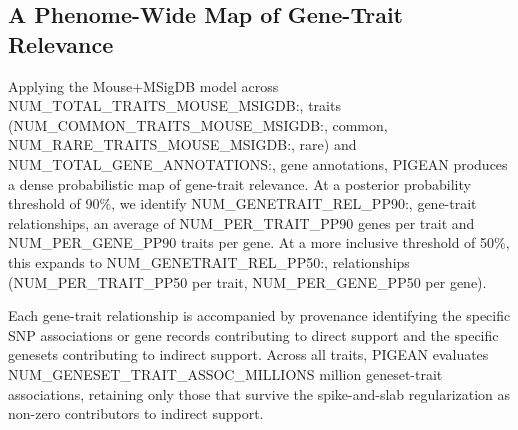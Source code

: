 \subsection{A Phenome-Wide Map of Gene-Trait Relevance}


Applying the Mouse+MSigDB model across {{NUM_TOTAL_TRAITS_MOUSE_MSIGDB:,}} traits ({{NUM_COMMON_TRAITS_MOUSE_MSIGDB:,}} common, {{NUM_RARE_TRAITS_MOUSE_MSIGDB:,}} rare) and {{NUM_TOTAL_GENE_ANNOTATIONS:,}} gene annotations, PIGEAN produces a dense probabilistic map of gene-trait relevance. At a posterior probability threshold of 90\%, we identify {{NUM_GENETRAIT_REL_PP90:,}} gene-trait relationships, an average of {{NUM_PER_TRAIT_PP90}} genes per trait and {{NUM_PER_GENE_PP90}} traits per gene. At a more inclusive threshold of 50\%, this expands to {{NUM_GENETRAIT_REL_PP50:,}} relationships ({{NUM_PER_TRAIT_PP50}} per trait, {{NUM_PER_GENE_PP50}} per gene).


Each gene-trait relationship is accompanied by provenance identifying the specific SNP associations or gene records contributing to direct support and the specific genesets contributing to indirect support. Across all traits, PIGEAN evaluates {{NUM_GENESET_TRAIT_ASSOC_MILLIONS}} million geneset-trait associations, retaining only those that survive the spike-and-slab regularization as non-zero contributors to indirect support.



